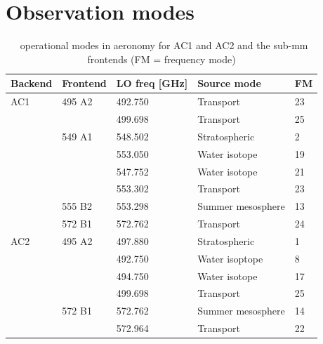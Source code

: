 
\chapter{Observation modes}

\begin{table}
\caption{ \smr\ operational modes in aeronomy  for AC1 and AC2
and the sub-mm frontends (FM = frequency mode)}
\label{table:config2}
\begin{tabular}{|l|l|l|l|l|}
  \hline
  \textbf{Backend} & \textbf{Frontend} & \textbf{LO freq {[}GHz{]}} & \textbf{Source mode} & \textbf{FM} \\
  \hline
   AC1             & 495 A2            &  492.750                   & Transport            & 23 \\
  \cline{3-3}
  \cline{4-4}
  \cline{5-5}
                  &                    & 499.698                    & Transport            & 25 \\
  \cline{2-2}
  \cline{3-3}
  \cline{4-4}
  \cline{5-5}
                  & 549 A1            & 548.502                    & Stratospheric         & 2 \\
  \cline{3-3}
  \cline{4-4}
  \cline{5-5}
                  &                   & 553.050                    & Water isotope         & 19 \\
  \cline{3-3}
  \cline{4-4}
  \cline{5-5}
                  &                   & 547.752                    & Water isotope         & 21 \\
  \cline{3-3}
  \cline{4-4}
  \cline{5-5}
                  &                   & 553.302                    & Transport             & 23 \\
  \cline{2-2}
  \cline{3-3}
  \cline{4-4}
  \cline{5-5}
                 & 555 B2             & 553.298                    & Summer mesosphere     & 13 \\
  \cline{2-2}
  \cline{3-3}
  \cline{4-4}
  \cline{5-5}
                & 572 B1             & 572.762                     & Transport             & 24 \\
  \hline
  AC2           & 495 A2             & 497.880                     & Stratospheric         & 1 \\
  \cline{3-3}
  \cline{4-4}
  \cline{5-5}
                &                    & 492.750                     & Water isoptope        & 8 \\
  \cline{3-3}
  \cline{4-4}
  \cline{5-5}
                &                    & 494.750                     & Water isotope         & 17 \\
  \cline{3-3}
  \cline{4-4}
  \cline{5-5}
                &                    & 499.698                     & Transport             & 25 \\
  \cline{2-2}
  \cline{3-3}
  \cline{4-4}
  \cline{5-5}
                & 572 B1             & 572.762                     & Summer mesosphere     & 14 \\
  \cline{3-3}
  \cline{4-4}
  \cline{5-5}
                &                    & 572.964                     & Transport            & 22 \\
\hline
\end{tabular}
\end{table}

